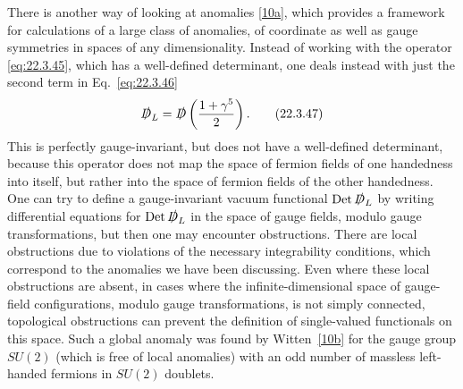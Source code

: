 There is another way of looking at anomalies
\hyperref[ch22-ref-10a]{[10a]}, which provides a framework for calculations
of a large class of anomalies, of coordinate as well as gauge symmetries
in spaces of any dimensionality. Instead of working with the operator
\eqref{eq:22.3.45}, which has a well-defined determinant, one deals instead
with just the second term in Eq.~\eqref{eq:22.3.46}
\begin{equation}
 \sl{D}_L=\sl{D}\left(\frac{1+\gamma^5}{2}\right).
 \tag{22.3.47}\label{eq:22.3.47}
\end{equation}
This is perfectly gauge-invariant, but does not have a well-defined
determinant, because this operator does not map the space of fermion fields
of one handedness into itself, but rather into the space of fermion fields
of the other handedness. One can try to define a gauge-invariant vacuum
functional $\operatorname{Det}\sl{D}_L$ by writing differential equations
for $\operatorname{Det}\sl{D}_L$ in the space of gauge fields, modulo gauge
transformations, but then one may encounter obstructions. There are local
obstructions due to violations of the necessary integrability conditions,
which correspond to the anomalies we have been discussing. Even where
these local obstructions are absent, in cases where the
infinite-dimensional space of gauge-field configurations, modulo gauge
transformations, is not simply connected, topological obstructions can
prevent the definition of single-valued functionals on this space. Such a
global anomaly was found by Witten~\hyperref[ch22-ref-10b]{[10b]} for the
gauge group $SU(2)$ (which is free of local anomalies) with an odd number
of massless left-handed fermions in $SU(2)$ doublets.
